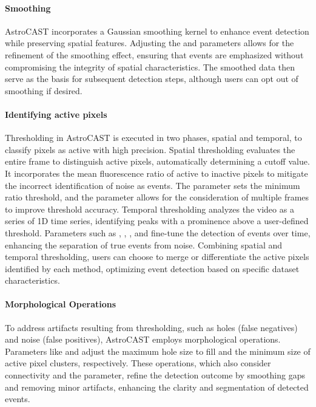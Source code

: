 \paragraph{Smoothing}
AstroCAST incorporates a Gaussian smoothing kernel to enhance event detection while preserving spatial features.
Adjusting the  and  parameters allows for
the refinement of the smoothing effect, ensuring that events are emphasized without compromising the integrity of
spatial characteristics. The smoothed data then serve as the basis for subsequent detection steps, although users can
opt out of smoothing if desired.

\paragraph{Identifying active pixels}
Thresholding in AstroCAST is executed in two phases, spatial and temporal, to classify pixels as active with high precision. 
Spatial thresholding evaluates the entire frame to distinguish active pixels, automatically determining a cutoff value. It incorporates the mean fluorescence ratio of active to inactive pixels to mitigate the incorrect identification of noise as events. The  parameter sets the minimum ratio threshold, and the  parameter allows for the consideration of multiple frames to improve threshold accuracy.
Temporal thresholding analyzes the video as a series of 1D time series, identifying peaks with a prominence above a user-defined threshold. Parameters such as , , , and  fine-tune the detection of events over time, enhancing the separation of true events from noise.
Combining spatial and temporal thresholding, users can choose to merge or differentiate the active pixels identified by each method, optimizing event detection based on specific dataset characteristics.

\paragraph{Morphological Operations}
To address artifacts resulting from thresholding, such as holes (false negatives) and noise (false positives), AstroCAST employs morphological operations. Parameters like  and  adjust the maximum hole size to fill and the minimum size of active pixel clusters, respectively. These operations, which also consider connectivity and the  parameter, refine the detection outcome by smoothing gaps and removing minor artifacts, enhancing the clarity and segmentation of detected events.

